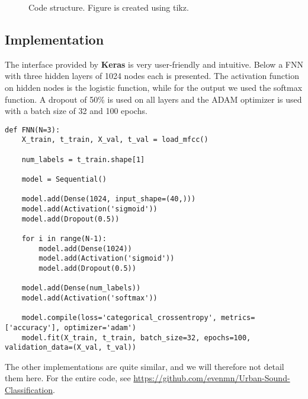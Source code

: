 \begin{figure} [H]
	\caption{Code structure. Figure is created using tikz. \cite{tikz}}
	\label{fig:code_structure}
\end{figure}

\subsection{Implementation}
The interface provided by \textbf{Keras} is very user-friendly and intuitive. Below a FNN with three hidden layers of 1024 nodes each is presented. The activation function on hidden nodes is the logistic function, while for the output we used the softmax function. A dropout of 50\% is used on all layers and the ADAM optimizer is used with a batch size of 32 and 100 epochs. 
\lstset{basicstyle=\scriptsize}
\begin{lstlisting}
def FNN(N=3):
    X_train, t_train, X_val, t_val = load_mfcc()

    num_labels = t_train.shape[1]

    model = Sequential()

    model.add(Dense(1024, input_shape=(40,)))
    model.add(Activation('sigmoid'))
    model.add(Dropout(0.5))

    for i in range(N-1):
        model.add(Dense(1024))
        model.add(Activation('sigmoid'))
        model.add(Dropout(0.5))

    model.add(Dense(num_labels))
    model.add(Activation('softmax'))

    model.compile(loss='categorical_crossentropy', metrics=['accuracy'], optimizer='adam')
    model.fit(X_train, t_train, batch_size=32, epochs=100, validation_data=(X_val, t_val))
\end{lstlisting}
The other implementations are quite similar, and we will therefore not detail them here. For the entire code, see \url{https://github.com/evenmn/Urban-Sound-Classification}.